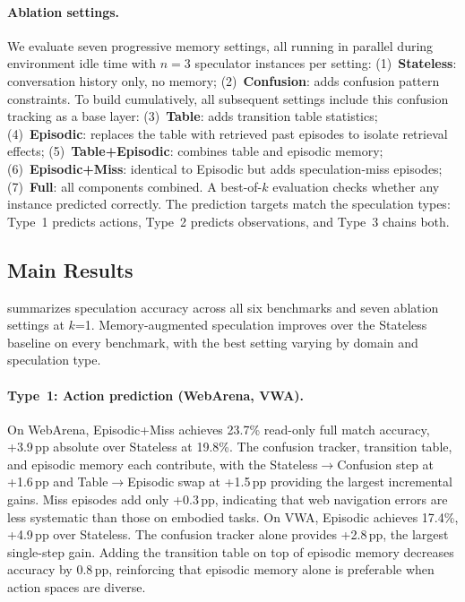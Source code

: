 \documentclass{article}
\begin{document}
\paragraph{Ablation settings.}
\label{sec:setup:settings} We evaluate seven progressive memory settings, all running in parallel during environment idle time with $n=3$ speculator instances per setting: (1)~\textbf{Stateless}: conversation history only, no memory; (2)~\textbf{Confusion}: adds confusion pattern constraints. To build cumulatively, all subsequent settings include this confusion tracking as a base layer: (3)~\textbf{Table}: adds transition table statistics; (4)~\textbf{Episodic}: replaces the table with retrieved past episodes to isolate retrieval effects; (5)~\textbf{Table+Episodic}: combines table and episodic memory; (6)~\textbf{Episodic+Miss}: identical to Episodic but adds speculation-miss episodes; (7)~\textbf{Full}: all components combined. A best-of-$k$ evaluation checks whether any instance predicted correctly. The prediction targets match the speculation types: Type~1 predicts actions, Type~2 predicts observations, and Type~3 chains both.

\subsection{Main Results}
\label{sec:main_results}



 summarizes speculation accuracy across all six benchmarks and seven ablation settings at $k$=1. Memory-augmented speculation improves over the Stateless baseline on every benchmark, with the best setting varying by domain and speculation type.

\paragraph{Type~1: Action prediction (WebArena, VWA).}
On WebArena, Episodic+Miss achieves 23.7\% read-only full match accuracy, +3.9\,pp absolute over Stateless at 19.8\%. The confusion tracker, transition table, and episodic memory each contribute, with the Stateless$\to$Confusion step at +1.6\,pp and Table$\to$Episodic swap at +1.5\,pp providing the largest incremental gains. Miss episodes add only +0.3\,pp, indicating that web navigation errors are less systematic than those on embodied tasks. On VWA, Episodic achieves 17.4\%, +4.9\,pp over Stateless. The confusion tracker alone provides +2.8\,pp, the largest single-step gain. Adding the transition table on top of episodic memory decreases accuracy by 0.8\,pp, reinforcing that episodic memory alone is preferable when action spaces are diverse.
\end{document}
